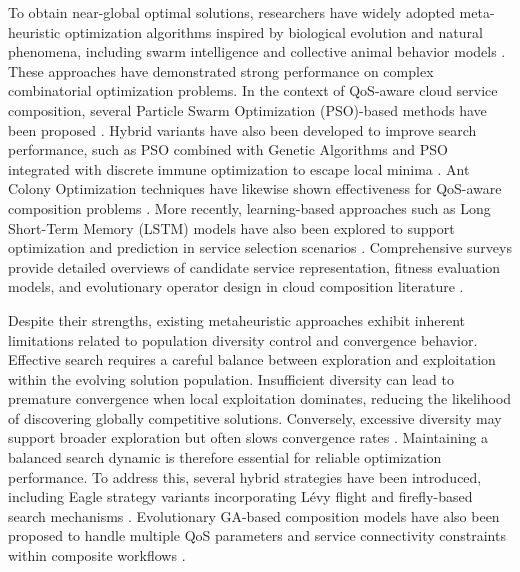 \documentclass[3p,twocolumn]{elsarticle}
\theoremstyle{thmstyleone}%
\theoremstyle{thmstyletwo}%
\theoremstyle{thmstylethree}%
\begin{document}
To obtain near-global optimal solutions, researchers have widely adopted meta-heuristic optimization algorithms inspired by biological evolution and natural phenomena, including swarm intelligence and collective animal behavior models \cite{asghari2018nature}. These approaches have demonstrated strong performance on complex combinatorial optimization problems. In the context of QoS-aware cloud service composition, several Particle Swarm Optimization (PSO)-based methods have been proposed \cite{zhang2014qos, khanam2018qos, tomar2022decision, naseri2019new}. Hybrid variants have also been developed to improve search performance, such as PSO combined with Genetic Algorithms \cite{faruk2016genetic} and PSO integrated with discrete immune optimization to escape local minima \cite{zhao2012improved}. Ant Colony Optimization techniques have likewise shown effectiveness for QoS-aware composition problems \cite{dahan2021enhanced}. More recently, learning-based approaches such as Long Short-Term Memory (LSTM) models have also been explored to support optimization and prediction in service selection scenarios \cite{haytamy2020deep}. Comprehensive surveys provide detailed overviews of candidate service representation, fitness evaluation models, and evolutionary operator design in cloud composition literature \cite{da2020survey, jula2014cloud}.

Despite their strengths, existing metaheuristic approaches exhibit inherent limitations related to population diversity control and convergence behavior. Effective search requires a careful balance between exploration and exploitation within the evolving solution population. Insufficient diversity can lead to premature convergence when local exploitation dominates, reducing the likelihood of discovering globally competitive solutions. Conversely, excessive diversity may support broader exploration but often slows convergence rates \cite{youssef2020integrated}. Maintaining a balanced search dynamic is therefore essential for reliable optimization performance. To address this, several hybrid strategies have been introduced, including Eagle strategy variants incorporating Lévy flight and firefly-based search mechanisms \cite{asghari2018nature, gavvala2019qos}. Evolutionary GA-based composition models have also been proposed to handle multiple QoS parameters and service connectivity constraints within composite workflows \cite{jatoth2019optimal}.
\end{document}
